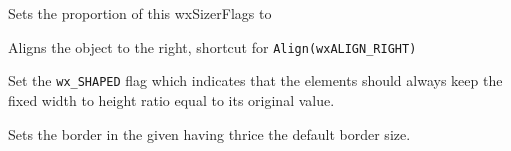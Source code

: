 
Sets the proportion of this wxSizerFlags to 


\label{wxsizerflagsright}


Aligns the object to the right, shortcut for \texttt{Align(wxALIGN\_RIGHT)}




\label{wxsizerflagsshaped}


Set the \texttt{wx\_SHAPED} flag which indicates that the elements should
always keep the fixed width to height ratio equal to its original value.


\label{wxsizerflagstriplebleborder}


Sets the border in the given  having thrice the default border
size.


